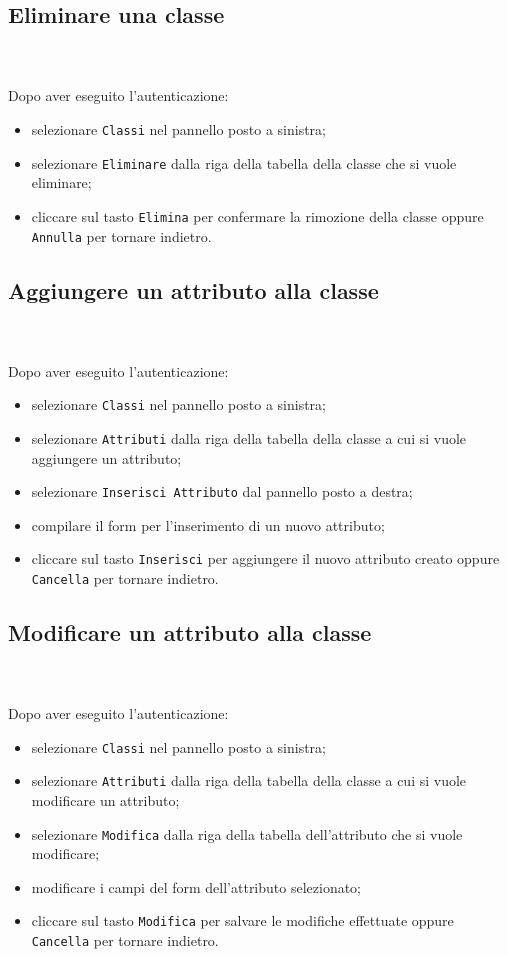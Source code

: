 	\subsection{Eliminare una classe} \mbox{}\\ \mbox{}\\
	Dopo aver eseguito l'autenticazione:
	\begin{itemize}
		\item selezionare \texttt{Classi} nel pannello posto a sinistra;
		\item selezionare \texttt{Eliminare} dalla riga della tabella della 
		classe
		che si vuole eliminare;
		\item cliccare sul tasto \texttt{Elimina} per confermare la rimozione 
		della classe
		oppure \texttt{Annulla} per tornare indietro.
	\end{itemize}
	
	\subsection{Aggiungere un attributo alla classe} \mbox{}\\ \mbox{}\\
	Dopo aver eseguito l'autenticazione:
	\begin{itemize}
		\item selezionare \texttt{Classi} nel pannello posto a sinistra;
		\item selezionare \texttt{Attributi} dalla riga della tabella della 
		classe
		a cui si vuole aggiungere un attributo;
		\item selezionare \texttt{Inserisci Attributo} dal pannello posto a 
		destra;
		\item compilare il form per l'inserimento di un nuovo attributo;
		\item cliccare sul tasto \texttt{Inserisci} per aggiungere il nuovo 
		attributo 
		creato oppure \texttt{Cancella} per tornare indietro.	
	\end{itemize}
	
	\subsection{Modificare un attributo alla classe} \mbox{}\\ \mbox{}\\
	Dopo aver eseguito l'autenticazione:
	\begin{itemize}
		\item selezionare \texttt{Classi} nel pannello posto a sinistra;
		\item selezionare \texttt{Attributi} dalla riga della tabella della 
		classe
		a cui si vuole modificare un attributo;\
		\item selezionare \texttt{Modifica} dalla riga della tabella 
		dell'attributo
		che si vuole modificare;
		\item modificare i campi del form dell'attributo selezionato;
		\item cliccare sul tasto \texttt{Modifica} per salvare le modifiche 
		effettuate
		oppure \texttt{Cancella} per tornare indietro.
	\end{itemize}
	
